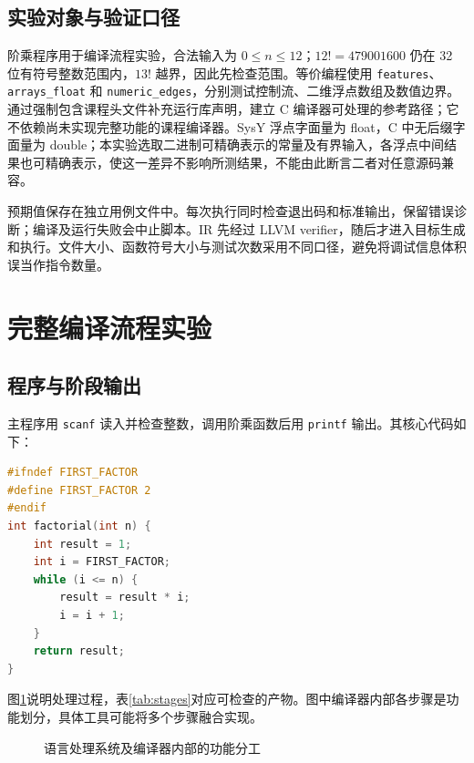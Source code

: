 \documentclass[UTF8,a4paper,10pt,fontset=fandol]{ctexart}
\begin{document}
\subsection{实验对象与验证口径}
阶乘程序用于编译流程实验，合法输入为 $0\le n\le12$；$12!=479001600$ 仍在 32 位有符号整数范围内，$13!$ 越界，因此先检查范围。等价编程使用 \texttt{features}、\texttt{arrays\_float} 和 \texttt{numeric\_edges}，分别测试控制流、二维浮点数组及数值边界。通过强制包含课程头文件补充运行库声明，建立 C 编译器可处理的参考路径；它不依赖尚未实现完整功能的课程编译器。SysY 浮点字面量为 float，C 中无后缀字面量为 double；本实验选取二进制可精确表示的常量及有界输入，各浮点中间结果也可精确表示，使这一差异不影响所测结果，不能由此断言二者对任意源码兼容。

预期值保存在独立用例文件中。每次执行同时检查退出码和标准输出，保留错误诊断；编译及运行失败会中止脚本。IR 先经过 LLVM verifier，随后才进入目标生成和执行。文件大小、函数符号大小与测试次数采用不同口径，避免将调试信息体积误当作指令数量。

\section{完整编译流程实验}
\subsection{程序与阶段输出}
主程序用 \texttt{scanf} 读入并检查整数，调用阶乘函数后用 \texttt{printf} 输出。其核心代码如下：
\par\noindent\begin{minipage}{\linewidth}
\begin{lstlisting}[language=C]
#ifndef FIRST_FACTOR
#define FIRST_FACTOR 2
#endif
int factorial(int n) {
    int result = 1;
    int i = FIRST_FACTOR;
    while (i <= n) {
        result = result * i;
        i = i + 1;
    }
    return result;
}
\end{lstlisting}
\end{minipage}\par

图\ref{fig:pipeline}说明处理过程，表\ref{tab:stages}对应可检查的产物。图中编译器内部各步骤是功能划分，具体工具可能将多个步骤融合实现。
\begin{figure}[H]
\centering
{}
\caption{语言处理系统及编译器内部的功能分工}\label{fig:pipeline}
\end{figure}
\end{document}
